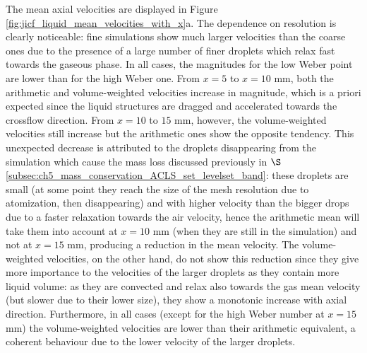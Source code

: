 The mean axial velocities are displayed in Figure \ref{fig:jicf_liquid_mean_velocities_with_x}a. The dependence on resolution is clearly noticeable: fine simulations show much larger velocities than the coarse ones due to the presence of a large number of finer droplets which relax fast towards the gaseous phase. In all cases, the magnitudes for the low Weber point are lower than for the high Weber one. From $x = 5$ to $x = 10$ mm, both the arithmetic and volume-weighted velocities increase in magnitude, which is a priori expected since the liquid structures are dragged and accelerated towards the crossflow direction. From $x = 10$ to $15$ mm, however, the volume-weighted velocities still increase but the arithmetic ones show the opposite tendency. This unexpected decrease is attributed to the droplets disappearing from the simulation which cause the mass loss discussed previously in $\S$\ref{subsec:ch5_mass_conservation_ACLS_set_levelset_band}: these droplets are small (at some point they reach the size of the mesh resolution due to atomization, then disappearing) and with higher velocity than the bigger drops due to a faster relaxation towards the air velocity, hence the arithmetic mean will take them into account at $x = 10$ mm (when they are still in the simulation) and not at $x = 15$ mm, producing a reduction in the mean velocity. The volume-weighted velocities, on the other hand, do not show this reduction since they give more importance to the velocities of the larger droplets as they contain more liquid volume: as they are convected and relax also towards the gas mean velocity (but slower due to their lower size), they show a monotonic increase with axial direction. Furthermore, in all cases (except for the high Weber number at $x = 15$ mm) the volume-weighted velocities are lower than their arithmetic equivalent, a coherent behaviour due to the lower velocity of the larger droplets. 






